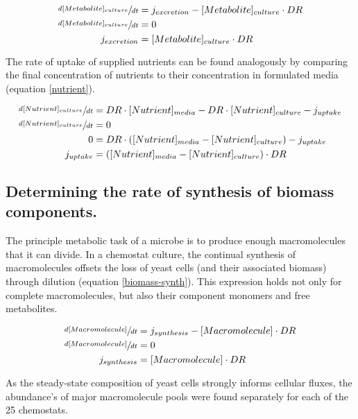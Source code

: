 \begin{align}
\sfrac{d[Metabolite]_{culture}}{dt} &= j_{excretion} - [Metabolite]_{culture} \cdot DR\notag\\
\sfrac{d[Metabolite]_{culture}}{dt} &= 0\notag\\
j_{excretion} &= [Metabolite]_{culture} \cdot DR \label{excretion}
\end{align}

The rate of uptake of supplied nutrients can be found analogously by comparing the final concentration of nutrients to their concentration in formulated media (equation \ref{nutrient}).

\begin{align}
\sfrac{d[Nutrient]_{culture}}{dt} &= DR \cdot [Nutrient]_{media} - DR \cdot [Nutrient]_{culture} - j_{uptake}\notag\\
\sfrac{d[Nutrient]_{culture}}{dt} &= 0\notag\\
0 &= DR \cdot ([Nutrient]_{media} - [Nutrient]_{culture}) - j_{uptake}\notag\\
 j_{uptake} &= ([Nutrient]_{media} - [Nutrient]_{culture}) \cdot DR\label{nutrient}
\end{align}

\subsection{Determining the rate of synthesis of biomass components.}

The principle metabolic task of a microbe is to produce enough macromolecules that it can divide.  In a chemostat culture, the continual synthesis of macromolecules offsets the loss of yeast cells (and their associated biomass) through dilution (equation \ref{biomass-synth}).  This expression holds not only for complete macromolecules, but also their component monomers and free metabolites.  

\begin{align}
\sfrac{d[Macromolecule]}{dt} &= j_{synthesis} - [Macromolecule] \cdot DR\notag\\
\sfrac{d[Macromolecule]}{dt} &= 0\notag\\
j_{synthesis} &= [Macromolecule] \cdot DR \label{biomass-synth}
\end{align}

As the steady-state composition of yeast cells strongly informs cellular fluxes, the abundance's of major macromolecule pools \cite{Lange:2001th} were found separately for each of the 25 chemostats.

